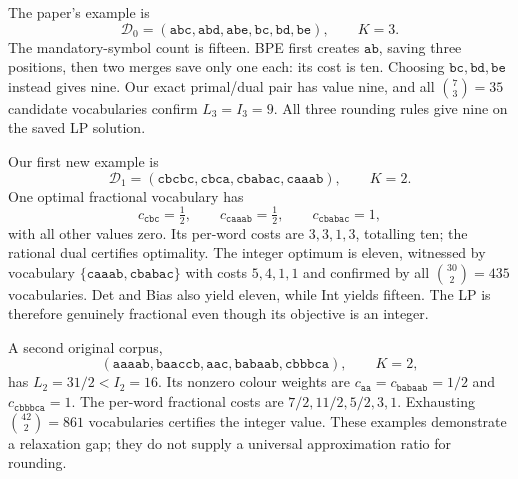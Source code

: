\documentclass[11pt,oneside,openany]{book}
\theoremstyle{definition}\newtheorem{definition}[theorem]{Definition}
\theoremstyle{remark}\newtheorem{remark}[theorem]{Remark}
\begin{document}
The paper's example is
\[
 \mathcal D_0=(\mathtt{abc},\mathtt{abd},\mathtt{abe},
              \mathtt{bc},\mathtt{bd},\mathtt{be}),\qquad K=3.
\]
The mandatory-symbol count is fifteen. BPE first creates $\mathtt{ab}$,
saving three positions, then two merges save only one each: its cost is
ten. Choosing $\mathtt{bc},\mathtt{bd},\mathtt{be}$ instead gives nine.
Our exact primal/dual pair has value nine, and all $\binom73=35$
candidate vocabularies confirm $L_3=I_3=9$. All three rounding rules give
nine on the saved LP solution.

Our first new example is
\[
 \mathcal D_1=(\mathtt{cbcbc},\mathtt{cbca},
              \mathtt{cbabac},\mathtt{caaab}),\qquad K=2.
\]
One optimal fractional vocabulary has
\[
 c_{\mathtt{cbc}}=\tfrac12,\qquad
 c_{\mathtt{caaab}}=\tfrac12,\qquad
 c_{\mathtt{cbabac}}=1,
\]
with all other values zero. Its per-word costs are $3,3,1,3$, totalling
ten; the rational dual certifies optimality. The integer optimum is
eleven, witnessed by vocabulary
$\{\mathtt{caaab},\mathtt{cbabac}\}$ with costs $5,4,1,1$ and confirmed
by all $\binom{30}{2}=435$ vocabularies. Det and Bias also yield eleven,
while Int yields fifteen. The LP is therefore genuinely fractional even
though its objective is an integer.

A second original corpus,
\[
 (\mathtt{aaaab},\mathtt{baaccb},\mathtt{aac},
   \mathtt{babaab},\mathtt{cbbbca}),\qquad K=2,
\]
has $L_2=31/2<I_2=16$. Its nonzero colour weights are
$c_{\mathtt{aa}}=c_{\mathtt{babaab}}=1/2$ and
$c_{\mathtt{cbbbca}}=1$. The per-word fractional costs are
$7/2,11/2,5/2,3,1$. Exhausting $\binom{42}{2}=861$ vocabularies certifies
the integer value. These examples demonstrate a relaxation gap; they do
not supply a universal approximation ratio for rounding.
\end{document}

